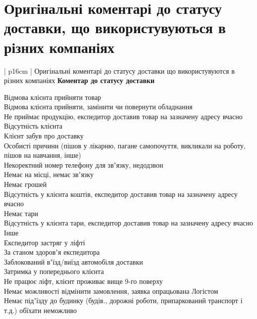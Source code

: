 \chapter{Оригінальні коментарі до статусу доставки, що використувуються в різних компаніях} \label{AppendixA}

\begin{mytable*}{ | p{16cm} | }%
	{Оригінальні коментарі до статусу доставки що використувуются в різних компаніях}%
	{\label{tbl:original_comments}}%
	{\textbf{Коментар до статусу доставки}}
	
	Відмова клієнта прийняти товар \\
	\nopagebreak\quad Відмова клієнта прийняти, замінити чи повернути обладнання \\
	\nopagebreak\quad Не приймає продукцію, експедитор доставив товар на зазначену адресу вчасно \\
	\hline
	Відсутність клієнта \\
	\nopagebreak\quad Клієнт забув про доставку \\
	\nopagebreak\quad Особисті причини (пішов у лікарню, пагане самопочуття, викликали на роботу, пішов на навчання, інше) \\
	\nopagebreak\quad Некоректний номер телефону для звʼязку, недодзвон \\
	\nopagebreak\quad Немає на місці, немає звʼязку \\
	\hline
	Немає грошей \\
	\nopagebreak\quad Відсутність у клієнта коштів, експедитор доставив товар на зазначену адресу вчасно \\
	\hline
	Немає тари \\
	\nopagebreak\quad Відсутність у клієнта тари, експедитор доставив товар на зазначену адресу вчасно \\
	\hline
	Інше \\
	\nopagebreak\quad Експедитор застряг у ліфті \\
	\nopagebreak\quad За станом здоровʼя експедитора \\
	\nopagebreak\quad Заблокований вʼїзд/виїзд автомобіля доставки \\
	\nopagebreak\quad Затримка у попереднього клієнта \\
	\nopagebreak\quad Не працює ліфт, клієнт проживає вище 9-го поверху \\
	\nopagebreak\quad Немає можливості  відмінити замовлення, заявка опрацьована Логістом \\
	\nopagebreak\quad Немає підʼїзду до будинку (будів., дорожні роботи, припаркований транспорт і т.д.) обїхати неможливо \\

\end{mytable*}
